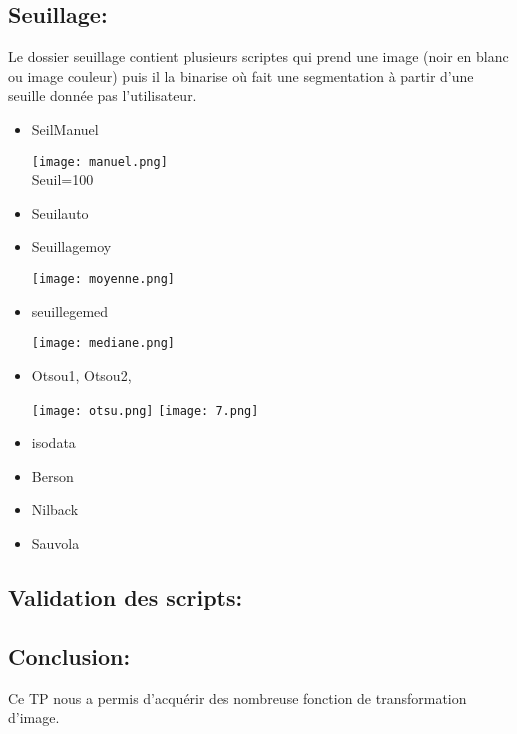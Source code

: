 \documentclass[12pt,a4paper,notitlepage]{report}
\begin{document}
\subsection*{Seuillage:}
Le dossier seuillage contient plusieurs scriptes qui prend une image (noir en blanc ou image couleur) puis il la binarise où fait une segmentation à partir d’une seuille donnée pas l’utilisateur.
\begin{itemize}
	\item SeilManuel\\
		\begin{center}
	\texttt{[image: manuel.png]} \\
	Seuil=100
		\end{center}
	\item Seuilauto
	\item Seuillagemoy
		\begin{center}
	\texttt{[image: moyenne.png]} \\
		\end{center}
	\item seuillegemed
			\begin{center}
	\texttt{[image: mediane.png]} \\
		\end{center}
	\item Otsou1, Otsou2,
	\begin{center}
		\texttt{[image: otsu.png]} 
		\texttt{[image: 7.png]}
	\end{center}
	\item isodata
	\item Berson
	\item Nilback
	\item Sauvola
\end{itemize}

\subsection*{Validation des scripts:}

\subsection*{Conclusion:}
Ce TP nous a permis d’acquérir des nombreuse fonction de transformation d’image. 
\end{document}
